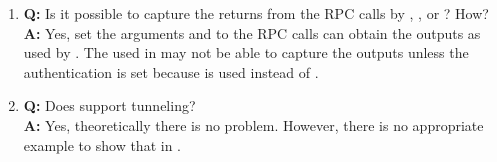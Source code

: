 \begin{enumerate}
\item {\bf\color{blue} Q:}
      Is it possible to capture the returns from the RPC calls
      by , , or ? How? \\
      {\bf\color{blue} A:}
      Yes, set the arguments  and 
      to the RPC calls can obtain the outputs as used by .
      The  used in  may not be able to capture
      the outputs unless the authentication is set because 
      is used instead of .

\item {\bf\color{blue} Q:}
      Does  support  tunneling? \\
      {\bf\color{blue} A:}
      Yes, theoretically there is no problem. However, there is no
      appropriate example to show that in .

\end{enumerate}

